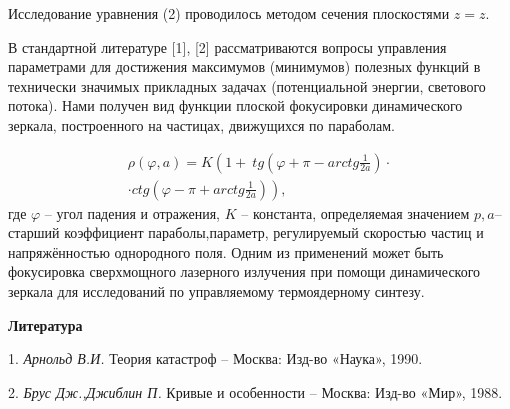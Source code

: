 Исследование уравнения (2) проводилось методом сечения плоскостями $z=z$.

В стандартной литературе [1], [2] рассматриваются вопросы управления параметрами для достижения максимумов (минимумов) полезных функций в технически значимых прикладных задачах (потенциальной энергии, светового потока). Нами получен вид функции плоской фокусировки динамического зеркала, построенного на частицах, движущихся по параболам.

\begin{multline*}
	\rho (\varphi ,a)=
	K\left(1+\ tg\left(\varphi +\pi -arctg\frac{1}{2a}\right)\cdot
	\right.\\ \cdot \left.
	 ctg\left(\varphi -\pi +arctg\frac{1}{2a}\right)\right),
\end{multline*}
где  $\varphi $ -- угол падения и отражения, $K$ -- константа, определяемая значением $p,a$-- старший коэффициент параболы,параметр, регулируемый скоростью частиц и напряжённостью  однородного поля. Одним из применений может быть фокусировка сверхмощного лазерного излучения при помощи динамического зеркала для исследований по управляемому термоядерному синтезу.



\smallskip \centerline{\bf Литература}\nopagebreak

1. {\it Арнольд В.И.} Теория катастроф -- Москва: Изд-во «Наука», 1990.

2. {\it Брус Дж.,Джиблин П.} Кривые и особенности -- Москва: Изд-во «Мир», 1988.


